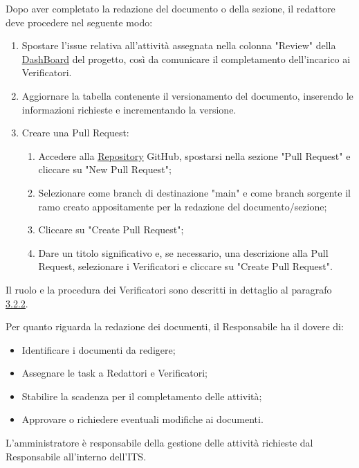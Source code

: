 Dopo aver completato la redazione del documento o della sezione, il redattore deve procedere nel seguente modo:
\begin{enumerate}
	\item Spostare l'issue relativa all'attività assegnata nella colonna "Review" della
	      \href{https://github.com/orgs/7Last/projects/1/views/1}{\underline{DashBoard}} del progetto, così da comunicare il completamento dell'incarico ai Verificatori.
	\item Aggiornare la tabella contenente il versionamento del documento, inserendo le informazioni richieste e incrementando la versione.
	\item Creare una Pull Request:
	      \begin{enumerate}
		      \item Accedere alla \href{https://github.com/7Last/docs}{\underline{Repository}} GitHub, spostarsi nella sezione "Pull Request" e cliccare su "New Pull Request";
		      \item Selezionare come branch di destinazione "main" e come branch sorgente il ramo creato appositamente per la redazione del documento/sezione;
		      \item Cliccare su "Create Pull Request";
		      \item Dare un titolo significativo e, se necessario, una descrizione alla Pull Request, selezionare i Verificatori e cliccare su "Create Pull Request".
	      \end{enumerate}
\end{enumerate}

Il ruolo e la procedura dei Verificatori sono descritti in dettaglio al paragrafo \href{#verifica_dei_documenti}{\underline{3.2.2}}.

Per quanto riguarda la redazione dei documenti, il Responsabile ha il dovere di:
\begin{itemize}
	\item Identificare i documenti da redigere;
	\item Assegnare le task a Redattori e Verificatori;
	\item Stabilire la scadenza per il completamento delle attività;
	\item Approvare o richiedere eventuali modifiche ai documenti.
\end{itemize}

L'amministratore è responsabile della gestione delle attività richieste dal Responsabile all'interno dell'ITS.

